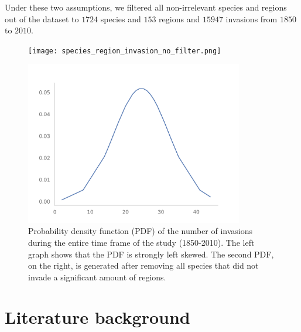 \documentclass[mscthesis]{usiinfthesis}
\begin{document}
Under these two assumptions, we filtered all non-irrelevant species and regions out of the dataset to $1724$ species and $153$ regions and $15947$ invasions from $1850$ to $2010$.

 
\begin{figure}
\centering
\begin{minipage}{.5\textwidth}
  \centering
    \texttt{[image: species\_region\_invasion\_no\_filter.png]}
\end{minipage}%
\begin{minipage}{.5\textwidth}
  \centering
    \includegraphics[width=0.85\textwidth]{species_region_invasion.png}
\end{minipage}
\caption{Probability density function (PDF) of the number of invasions during the entire time frame of the study (1850-2010). The left graph shows that the PDF is strongly left skewed. The second PDF, on the right, is generated after removing all species that did not invade a significant amount of regions.}
\label{fig:pdf_invasion}
\end{figure}

\chapter{Literature background}
\end{document}
